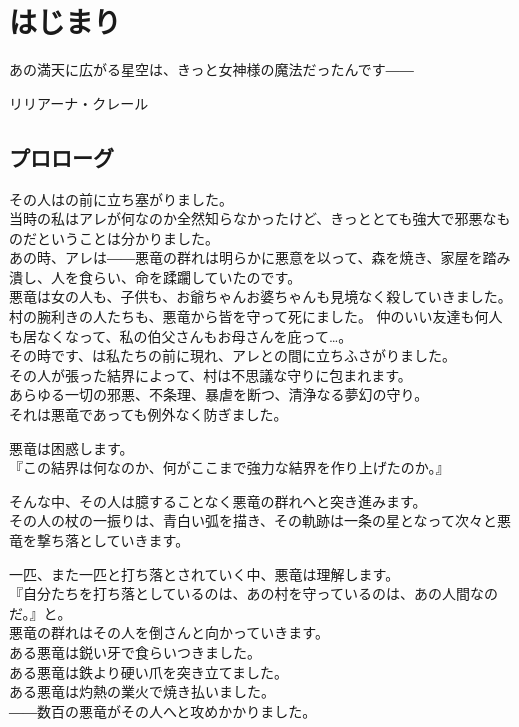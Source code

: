 \documentclass[oneside, a4paper]{jsbook}
\begin{document}
\chapter{はじまり}
\epigraph{あの満天に広がる星空は、きっと女神様の魔法だったんです――}{リリアーナ・クレール}

\section{プロローグ}

その人はの前に立ち塞がりました。\\

当時の私はアレが何なのか全然知らなかったけど、きっととても強大で邪悪なものだということは分かりました。\\
あの時、アレは――悪竜の群れは明らかに悪意を以って、森を焼き、家屋を踏み潰し、人を食らい、命を蹂躙していたのです。\\
悪竜は女の人も、子供も、お爺ちゃんお婆ちゃんも見境なく殺していきました。
村の腕利きの人たちも、悪竜から皆を守って死にました。
仲のいい友達も何人も居なくなって、私の伯父さんもお母さんを庇って\dots 。\\


その時です、は私たちの前に現れ、アレとの間に立ちふさがりました。\\
その人が張った結界によって、村は不思議な守りに包まれます。\\
あらゆる一切の邪悪、不条理、暴虐を断つ、清浄なる夢幻の守り。\\
それは悪竜であっても例外なく防ぎました。

悪竜は困惑します。\\
『この結界は何なのか、何がここまで強力な結界を作り上げたのか。』

そんな中、その人は臆することなく悪竜の群れへと突き進みます。\\
その人の杖の一振りは、青白い弧を描き、その軌跡は一条の星となって次々と悪竜を撃ち落としていきます。

一匹、また一匹と打ち落とされていく中、悪竜は理解します。\\
『自分たちを打ち落としているのは、あの村を守っているのは、あの人間なのだ。』と。\\


悪竜の群れはその人を倒さんと向かっていきます。\\
ある悪竜は鋭い牙で食らいつきました。\\
ある悪竜は鉄より硬い爪を突き立てました。\\
ある悪竜は灼熱の業火で焼き払いました。\\
――数百の悪竜がその人へと攻めかかりました。\\
\end{document}
